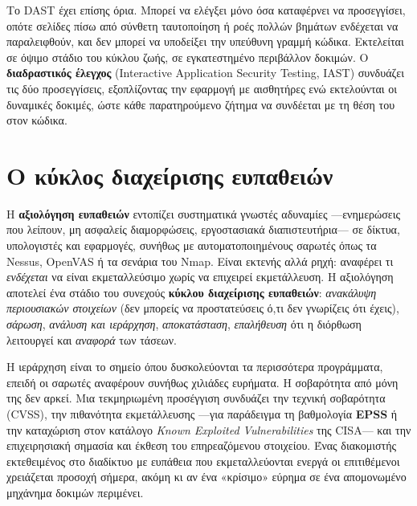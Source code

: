 Το DAST έχει επίσης όρια. Μπορεί να ελέγξει μόνο όσα καταφέρνει να προσεγγίσει, οπότε σελίδες πίσω από σύνθετη ταυτοποίηση ή ροές πολλών βημάτων ενδέχεται να παραλειφθούν, και δεν μπορεί να υποδείξει την υπεύθυνη γραμμή κώδικα. Εκτελείται σε όψιμο στάδιο του κύκλου ζωής, σε εγκατεστημένο περιβάλλον δοκιμών. Ο \textbf{διαδραστικός έλεγχος} (Interactive Application Security Testing, IAST) συνδυάζει τις δύο προσεγγίσεις, εξοπλίζοντας την εφαρμογή με αισθητήρες ενώ εκτελούνται οι δυναμικές δοκιμές, ώστε κάθε παρατηρούμενο ζήτημα να συνδέεται με τη θέση του στον κώδικα.

\section{Ο κύκλος διαχείρισης ευπαθειών}\label{sec:10.3}
Η \textbf{αξιολόγηση ευπαθειών} εντοπίζει συστηματικά γνωστές αδυναμίες —ενημερώσεις που λείπουν, μη ασφαλείς διαμορφώσεις, εργοστασιακά διαπιστευτήρια— σε δίκτυα, υπολογιστές και εφαρμογές, συνήθως με αυτοματοποιημένους σαρωτές όπως τα Nessus, OpenVAS ή τα σενάρια του Nmap. Είναι εκτενής αλλά ρηχή: αναφέρει τι \emph{ενδέχεται} να είναι εκμεταλλεύσιμο χωρίς να επιχειρεί εκμετάλλευση. Η αξιολόγηση αποτελεί ένα στάδιο του συνεχούς \textbf{κύκλου διαχείρισης ευπαθειών}: \emph{ανακάλυψη περιουσιακών στοιχείων} (δεν μπορείς να προστατεύσεις ό,τι δεν γνωρίζεις ότι έχεις), \emph{σάρωση}, \emph{ανάλυση και ιεράρχηση}, \emph{αποκατάσταση}, \emph{επαλήθευση} ότι η διόρθωση λειτουργεί και \emph{αναφορά} των τάσεων.

Η ιεράρχηση είναι το σημείο όπου δυσκολεύονται τα περισσότερα προγράμματα, επειδή οι σαρωτές αναφέρουν συνήθως χιλιάδες ευρήματα. Η σοβαρότητα από μόνη της δεν αρκεί. Μια τεκμηριωμένη προσέγγιση συνδυάζει την τεχνική σοβαρότητα (CVSS), την πιθανότητα εκμετάλλευσης —για παράδειγμα τη βαθμολογία \textbf{EPSS} ή την καταχώριση στον κατάλογο \emph{Known Exploited Vulnerabilities} της CISA— και την επιχειρησιακή σημασία και έκθεση του επηρεαζόμενου στοιχείου. Ένας διακομιστής εκτεθειμένος στο διαδίκτυο με ευπάθεια που εκμεταλλεύονται ενεργά οι επιτιθέμενοι χρειάζεται προσοχή σήμερα, ακόμη κι αν ένα «κρίσιμο» εύρημα σε ένα απομονωμένο μηχάνημα δοκιμών περιμένει.

